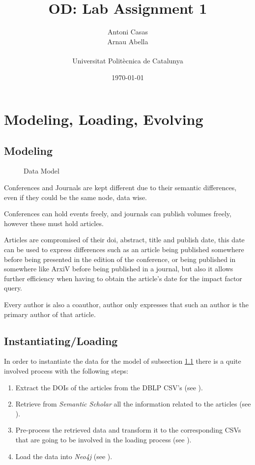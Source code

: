 \documentclass[11pt, a4paper]{article}
\title{%
  \vspace{-10ex}
  OD: Lab Assignment 1
}
\author{%
  Antoni Casas \\
  Arnau Abella \\
  \\
  \large{Universitat Polit\`ecnica de Catalunya}
}
\date{\today}
\begin{document}
\maketitle

\section{Modeling, Loading, Evolving}%

\subsection{Modeling}%
\label{sub:modeling}

\label{sec:modeling_loading_evolving}
\begin{figure}[H]
  \center
  \caption{Data Model}
  \label{fig:modifiedGraph}
\end{figure}

Conferences and Journals are kept different due to their semantic differences, even if they could be the same node, data wise.

Conferences can hold events freely, and journals can publish volumes freely, however these must hold articles.

Articles are compromised of their doi, abstract, title and publish date, this date can be used to express differences such as an article being published somewhere before being presented in the edition of the conference, or being published in somewhere like ArxiV before being published in a journal, but also it allows further efficiency when having to obtain the article's date for the impact factor query.

Every author is also a coauthor, author only expresses that such an author is the primary author of that article.

\subsection{Instantiating/Loading}%
\label{sub:instantiating_loading}

In order to instantiate the data for the model of subsection \ref{sub:modeling} there is a quite involved process with the following steps:

\begin{enumerate}
  \item Extract the DOIs of the articles from the DBLP CSV's (see ).
  \item Retrieve from \textit{Semantic Scholar} all the information related to the articles (see ).
  \item Pre-process the retrieved data and transform it to the corresponding CSVs that are going to be involved in the loading process (see ).
  \item Load the data into \textit{Neo4j} (see ).
\end{enumerate}
\end{document}
